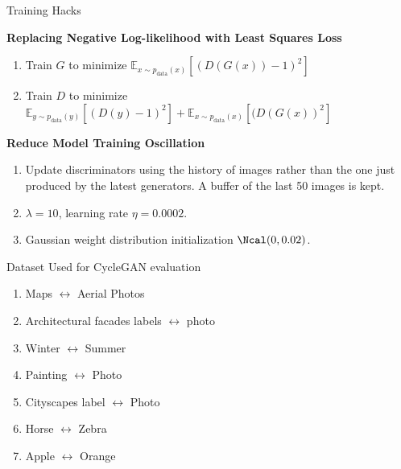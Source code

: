 \documentclass[aspectratio=169,xcolor=dvipsnames,svgnames,x11names,fleqn]{beamer}
\begin{document}
\begin{frame}{Training Hacks}

\textbf{Replacing Negative Log-likelihood with Least Squares Loss}


\begin{enumerate}
\item Train $G$ to minimize $ \mathbb{E}_{x \sim p_{\text{data}}(x)} \left[ (D(G(x)) - 1)^2 \right]$
\item Train $D$ to minimize $ \mathbb{E}_{y \sim p_{\text{data}}(y)} \left[ (D(y) - 1)^2 \right] +  \mathbb{E}_{x \sim p_{\text{data}}(x)} \left[ (D(G(x))^2\right]$


\end{enumerate}

\textbf{Reduce Model Training Oscillation}

\begin{enumerate}

\item Update discriminators using the history of images rather than the one just produced by the latest generators. A buffer of the last 50 images is kept.
\item $\lambda = 10$, learning rate $\eta = 0.0002$.
\item Gaussian weight distribution initialization $\Ncal(0, 0.02)$.
\end{enumerate}

\end{frame}


\begin{frame}{Dataset Used for CycleGAN evaluation}

\begin{enumerate}
\item Maps $\longleftrightarrow$ Aerial Photos
\item Architectural facades labels $\longleftrightarrow$ photo
\item Winter $\longleftrightarrow$ Summer
\item Painting $\longleftrightarrow$ Photo
\item Cityscapes label $\longleftrightarrow$ Photo
\item Horse $\longleftrightarrow$ Zebra
\item Apple $\longleftrightarrow$ Orange
\end{enumerate}

\end{frame}
\end{document}
